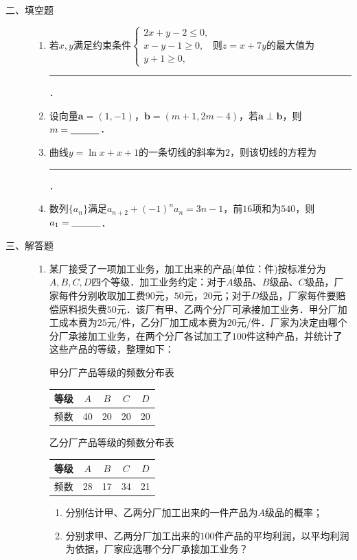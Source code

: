 \begin{description}
    \item[二、填空题]
    \begin{enumerate}[leftmargin=5pt]
        \addtocounter{enumi}{+12}
        \item 若$x,y$满足约束条件$\begin{cases}2x+y-2\leqslant 0,\\x-y-1\geqslant 0,\\y+1\geqslant 0,\end{cases}$则$z=x+7y$的最大值为\rule[-0.3ex]{3em}{0.4pt}．
        \item 设向量$\bm{a}=(1,-1)$，$\bm{b}=(m+1,2m-4)$，若$\bm{a}\perp\bm{b}$，则$m=\rule[-0.3ex]{3em}{0.4pt}$．
        \item 曲线$y=\ln x+x+1$的一条切线的斜率为$2$，则该切线的方程为\rule[-0.3ex]{3em}{0.4pt}．
        \item 数列$\{a_n\}$满足$a_{n+2}+(-1)^n a_n=3n-1$，前$16$项和为$540$，则$a_1=\rule[-0.3ex]{3em}{0.4pt}$．
    \end{enumerate}

    \item[三、解答题]
    \begin{enumerate}[leftmargin=5pt]
        \addtocounter{enumi}{+16}
        \item 某厂接受了一项加工业务，加工出来的产品(单位：件)按标准分为$A,B,C,D$四个等级．加工业务约定：对于$A$级品、$B$级品、$C$级品，厂家每件分别收取加工费$90$元，$50$元，$20$元；对于$D$级品，厂家每件要赔偿原料损失费$50$元．该厂有甲、乙两个分厂可承接加工业务．甲分厂加工成本费为$25$元/件，乙分厂加工成本费为$20$元/件．厂家为决定由哪个分厂承接加工业务，在两个分厂各试加工了$100$件这种产品，并统计了这些产品的等级，整理如下：
        \begin{center}
甲分厂产品等级的频数分布表

\begin{tabular}{c|cccc}
\hline
等级 & $A$ & $B$ & $C$ & $D$ \\
\hline
频数 & 40 & 20 & 20 & 20 \\
\hline
\end{tabular}
\end{center}

\begin{center}
乙分厂产品等级的频数分布表

\begin{tabular}{c|cccc}
\hline
等级 & $A$ & $B$ & $C$ & $D$ \\
\hline
频数 & 28 & 17 & 34 & 21 \\
\hline
\end{tabular}
\end{center}
        \begin{enumerate}[label=(\arabic*)]
            \item 分别估计甲、乙两分厂加工出来的一件产品为$A$级品的概率；
            \item 分别求甲、乙两分厂加工出来的$100$件产品的平均利润，以平均利润为依据，厂家应选哪个分厂承接加工业务？
        \end{enumerate}


\end{enumerate}
\end{description}
